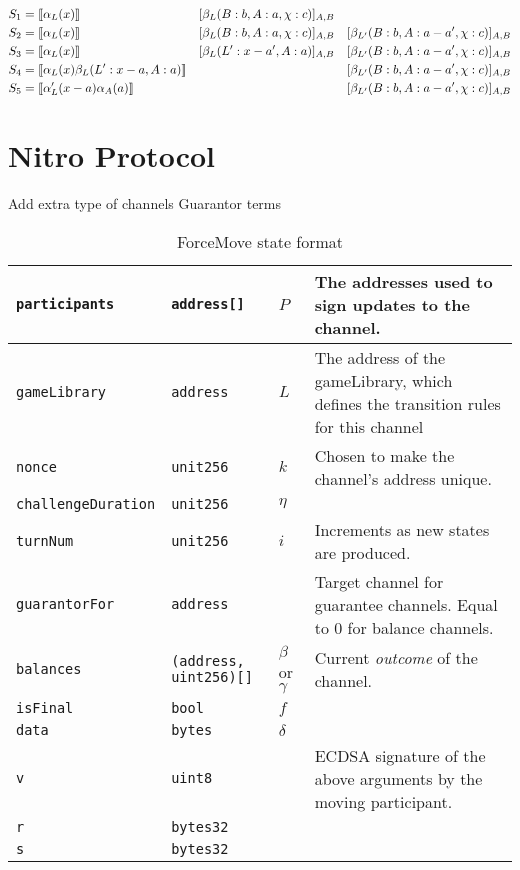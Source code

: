 \begin{align*}
S_1 &= \llbracket \alpha_L(x) \rrbracket &&[\beta_L(B: b, A: a, \chi: c)]_{A, B} & \\
S_2 &= \llbracket \alpha_L(x) \rrbracket &&[\beta_L(B: b, A: a, \chi: c)]_{A, B} & [\beta_{L'}(B: b, A: a - a', \chi: c)]_{A, B}\\
S_3 &= \llbracket \alpha_L(x) \rrbracket &&[\beta_L(L': x-a', A: a)]_{A, B} & [\beta_{L'}(B: b, A: a - a', \chi: c)]_{A, B}\\
S_4 &= \llbracket \alpha_L(x)\beta_L(L': x-a, A: a) \rrbracket && & [\beta_{L'}(B: b, A: a - a', \chi: c)]_{A, B}\\
S_5 &= \llbracket \alpha_L'(x-a)\alpha_A(a) \rrbracket && & [\beta_{L'}(B: b, A: a - a', \chi: c)]_{A, B}\\
\end{align*}


\section{Nitro Protocol}

Add extra type of channels
Guarantor terms

\begin{table}[h]
  \begin{tabular}{|l|l|l|p{5cm}|}
    \hline
    \texttt{participants} & \texttt{address[]} & $P$ & The addresses used to sign updates to the channel. \\ \hline
    \texttt{gameLibrary} & \texttt{address} & $L$ & The address of the gameLibrary, which defines the transition rules for this channel \\ \hline
    \texttt{nonce} & \texttt{unit256} & $k$ & Chosen to make the channel's address unique. \\ \hline
    \texttt{challengeDuration} & \texttt{unit256} & $\eta$ & \\ \hline
    \texttt{turnNum} & \texttt{unit256} & $i$ & Increments as new states are produced. \\ \hline
    \texttt{guarantorFor} & \texttt{address} &  & Target channel for guarantee channels. Equal to 0 for balance channels. \\ \hline
    \texttt{balances} & \texttt{(address, uint256)[]} & $\beta$ or $\gamma$ & Current \textit{outcome} of the channel. \\ \hline
    \texttt{isFinal} & \texttt{bool} & $f$ & \\ \hline
    \texttt{data} & \texttt{bytes} & $\delta$ & \\ \hline
    \texttt{v} & \texttt{uint8} & &  ECDSA signature of the above arguments by the moving participant. \\ \cline{1-2}
    \texttt{r} & \texttt{bytes32} & & \\ \cline{1-2}
    \texttt{s} & \texttt{bytes32} & & \\ \hline
  \end{tabular}
  \caption{ForceMove state format}
  \label{table:force-move-state}
\end{table}

